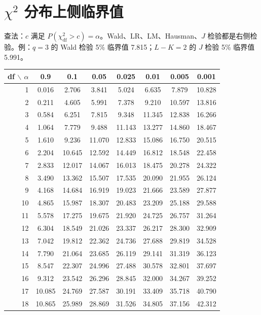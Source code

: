 \section{\texorpdfstring{$\chi^2$}{chi2} 分布上侧临界值}
查法：$c$ 满足 $P(\chi^2_{\mathrm{df}}>c)=\alpha$。Wald、LR、LM、Hausman、$J$ 检验都是右侧检验。例：$q=3$ 的 Wald 检验 5\% 临界值 7.815；$L-K=2$ 的 $J$ 检验 5\% 临界值 5.991。
\begin{center}\small\setlength{\tabcolsep}{6pt}\renewcommand{\arraystretch}{1.0}\label{tab:chi}
\begin{tabular}{r|ccccccc}\toprule
df $\backslash$ $\alpha$ & 0.9 & 0.1 & 0.05 & 0.025 & 0.01 & 0.005 & 0.001\\\midrule
1 & 0.016 & 2.706 & 3.841 & 5.024 & 6.635 & 7.879 & 10.828\\
2 & 0.211 & 4.605 & 5.991 & 7.378 & 9.210 & 10.597 & 13.816\\
3 & 0.584 & 6.251 & 7.815 & 9.348 & 11.345 & 12.838 & 16.266\\
4 & 1.064 & 7.779 & 9.488 & 11.143 & 13.277 & 14.860 & 18.467\\
5 & 1.610 & 9.236 & 11.070 & 12.833 & 15.086 & 16.750 & 20.515\\
6 & 2.204 & 10.645 & 12.592 & 14.449 & 16.812 & 18.548 & 22.458\\
7 & 2.833 & 12.017 & 14.067 & 16.013 & 18.475 & 20.278 & 24.322\\
8 & 3.490 & 13.362 & 15.507 & 17.535 & 20.090 & 21.955 & 26.124\\
9 & 4.168 & 14.684 & 16.919 & 19.023 & 21.666 & 23.589 & 27.877\\
10 & 4.865 & 15.987 & 18.307 & 20.483 & 23.209 & 25.188 & 29.588\\
11 & 5.578 & 17.275 & 19.675 & 21.920 & 24.725 & 26.757 & 31.264\\
12 & 6.304 & 18.549 & 21.026 & 23.337 & 26.217 & 28.300 & 32.909\\
13 & 7.042 & 19.812 & 22.362 & 24.736 & 27.688 & 29.819 & 34.528\\
14 & 7.790 & 21.064 & 23.685 & 26.119 & 29.141 & 31.319 & 36.123\\
15 & 8.547 & 22.307 & 24.996 & 27.488 & 30.578 & 32.801 & 37.697\\
16 & 9.312 & 23.542 & 26.296 & 28.845 & 32.000 & 34.267 & 39.252\\
17 & 10.085 & 24.769 & 27.587 & 30.191 & 33.409 & 35.718 & 40.790\\
18 & 10.865 & 25.989 & 28.869 & 31.526 & 34.805 & 37.156 & 42.312\\

\end{tabular}
\end{center}
